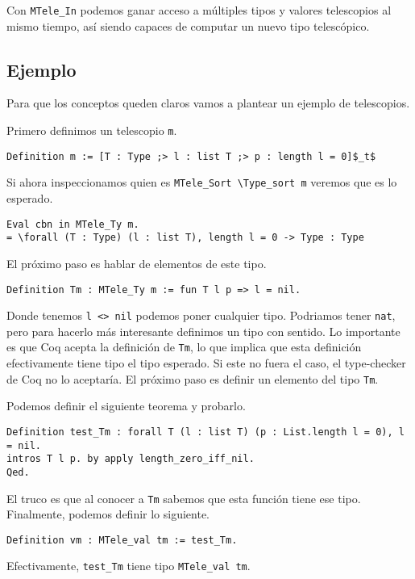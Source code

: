 Con \lstinline{MTele_In} podemos ganar acceso a múltiples tipos y valores telescopios al mismo tiempo, así siendo capaces de computar un nuevo tipo telescópico.

\subsection{Ejemplo}

Para que los conceptos queden claros vamos a plantear un ejemplo de telescopios.

Primero definimos un telescopio \lstinline{m}.

\begin{lstlisting}
Definition m := [T : Type ;> l : list T ;> p : length l = 0]$_t$
\end{lstlisting}

Si ahora inspeccionamos quien es \lstinline{MTele_Sort \Type_sort m} veremos que es lo esperado.

\begin{lstlisting}
Eval cbn in MTele_Ty m.
= \forall (T : Type) (l : list T), length l = 0 -> Type : Type
\end{lstlisting}

El próximo paso es hablar de elementos de este tipo.

\begin{lstlisting}
Definition Tm : MTele_Ty m := fun T l p => l = nil.
\end{lstlisting}

Donde tenemos \lstinline{l <> nil} podemos poner cualquier tipo.
Podriamos tener \lstinline{nat}, pero para hacerlo más interesante definimos un tipo con sentido.
Lo importante es que Coq acepta la definición de \lstinline{Tm}, lo que implica que esta definición efectivamente tiene tipo el tipo esperado.
Si este no fuera el caso, el type-checker de Coq no lo aceptaría.
El próximo paso es definir un elemento del tipo \lstinline{Tm}.

Podemos definir el siguiente teorema y probarlo.

\begin{lstlisting}
Definition test_Tm : forall T (l : list T) (p : List.length l = 0), l = nil.
intros T l p. by apply length_zero_iff_nil.
Qed.
\end{lstlisting}

El truco es que al conocer a \lstinline{Tm} sabemos que esta función tiene ese tipo.
Finalmente, podemos definir lo siguiente.

\begin{lstlisting}
Definition vm : MTele_val tm := test_Tm.
\end{lstlisting}

Efectivamente, \lstinline{test_Tm} tiene tipo \lstinline{MTele_val tm}.
